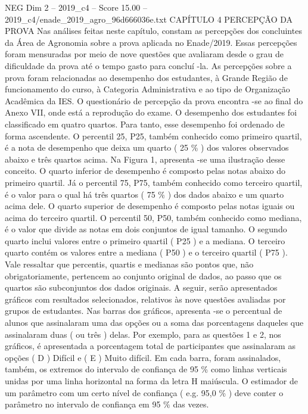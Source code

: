 \begin{textsample}{NEG Dim 2 – 2019\_c4 – Score 15.00 – 2019\_c4/enade\_2019\_agro\_96d666036e.txt}  \label{ex:f2_neg_387}
CAPÍTULO 4 PERCEPÇÃO DA PROVA Nas análises feitas neste capítulo, constam as percepções dos concluintes da Área de Agronomia sobre a prova aplicada no Enade/2019.
Essas percepções foram mensuradas por meio de nove questões que avaliaram desde o grau de dificuldade da prova até o tempo gasto para concluí -la.
As percepções sobre a prova foram relacionadas ao desempenho dos estudantes, à Grande Região de funcionamento do curso, à Categoria Administrativa e ao tipo de Organização Acadêmica da IES.
O questionário de percepção da prova encontra -se ao final do Anexo VII, onde está a reprodução do exame.
O desempenho dos estudantes foi classificado em quatro quartos.
Para tanto, esse desempenho foi ordenado de forma ascendente.
O percentil 25, P25, também conhecido como primeiro quartil, é a nota de desempenho que deixa um quarto ( 25 \% ) dos valores observados abaixo e três quartos acima.
Na Figura 1, apresenta -se uma ilustração desse conceito.
O quarto inferior de desempenho é composto pelas notas abaixo do primeiro quartil.
Já o percentil 75, P75, também conhecido como terceiro quartil, é o valor para o qual há três quartos ( 75 \% ) dos dados abaixo e um quarto acima dele.
O quarto superior de desempenho é composto pelas notas iguais ou acima do terceiro quartil.
O percentil 50, P50, também conhecido como mediana, é o valor que divide as notas em dois conjuntos de igual tamanho.
O segundo quarto inclui valores entre o primeiro quartil ( P25 ) e a mediana.
O terceiro quarto contém os valores entre a mediana ( P50 ) e o terceiro quartil ( P75 ).
Vale ressaltar que percentis, quartis e medianas são pontos que, não obrigatoriamente, pertencem ao conjunto original de dados, ao passo que os quartos são subconjuntos dos dados originais.
A seguir, serão apresentados gráficos com resultados selecionados, relativos às nove questões avaliadas por grupos de estudantes.
Nas barras dos gráficos, apresenta -se o percentual de alunos que assinalaram uma das opções ou a soma das porcentagens daqueles que assinalaram duas ( ou três ) delas.
Por exemplo, para as questões 1 e 2, nos gráficos, é apresentada a porcentagem total de participantes que assinalaram as opções ( D ) Difícil e ( E ) Muito difícil.
Em cada barra, foram assinalados, também, os extremos do intervalo de confiança de 95 \% como linhas verticais unidas por uma linha horizontal na forma da letra H maiúscula.
O estimador de um parâmetro com um certo nível de confiança ( e.g. 95,0 \% ) deve conter o parâmetro no intervalo de confiança em 95 \% das vezes.

\end{textsample}
